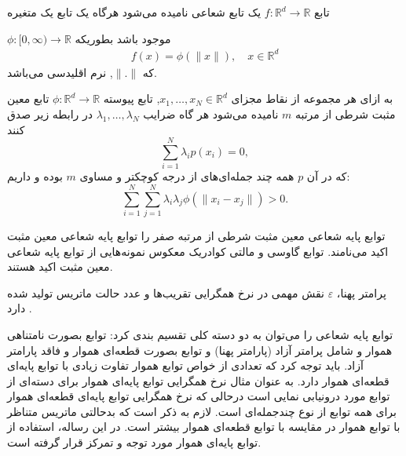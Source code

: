 \begin{definition}
	تابع
	$f:\mathbb{R}^d\rightarrow\mathbb{R}$ 
	یک تابع شعاعی نامیده می‌شود هرگاه یک تابع یک متغیره 
	
	$\phi:[0,\infty)\rightarrow\mathbb{R}$ 
	موجود باشد بطوریکه 
	\begin{eqnarray}
		f(x)=\phi(\|x\|),\quad x\in \mathbb{R}^d\label{eq:radial}
	\end{eqnarray}
	که 
	$\|.\|$,
	نرم اقلیدسی می‌باشد.
\end{definition}
%
\begin{lem}
	به ازای هر مجموعه از نقاط مجزای
	$x_1,\ldots,x_N\in\mathbb{R}^d$,
	تابع پیوسته
	$\phi:\mathbb{R}^d\rightarrow\mathbb{R}$ 
	تابع معین مثبت شرطی  از مرتبه
	$m$
	نامیده می‌شود هر گاه ضرایب
	$\lambda_1,\ldots,\lambda_N$
	در رابطه زیر صدق کنند
	\begin{equation*}
		\sum_{i=1}^{N}\lambda_ip(x_i)=0,
	\end{equation*}
	که در آن
	$p$
	همه چند جمله‌ای‌های از درجه کوچکتر و مساوی
	$m$
	بوده و داریم:
	\begin{equation*}
		\sum_{i=1}^{N}\sum_{j=1}^{N}\lambda_i\lambda_j\phi(\|x_i-x_j\|)>0.
	\end{equation*}
\end{lem}

توابع پایه شعاعی معین مثبت شرطی از مرتبه صفر را توابع پایه شعاعی معین مثبت اکید می‌نامند. توابع گاوسی و مالتی کوادریک معکوس نمونه‌هایی از توابع پایه شعاعی معین مثبت اکید هستند.

پرامتر پهنا،
$\varepsilon$
نقش مهمی در نرخ همگرایی تقریب‌ها و عدد حالت ماتریس تولید شده دارد
\citep{Wendland,Fasshauer}.

توابع پایه شعاعی را می‌توان به دو دسته کلی تقسیم بندی کرد: توابع بصورت نامتناهی هموار و شامل پرامتر آزاد (پارامتر پهنا)
و  توابع بصورت قطعه‌ای هموار و فاقد پارامتر آزاد. باید توجه کرد که تعدادی از خواص توابع هموار تفاوت زیادی با توابع پایه‌ای قطعه‌ای  هموار دارد. به عنوان مثال نرخ همگرایی توابع پایه‌ای هموار برای دسته‌ای از توابع مورد درونیابی نمایی است درحالی که نرخ همگرایی توابع پایه‌ای قطعه‌ای هموار برای همه توابع از نوع چندجمله‌ای است. لازم به ذکر است که  بدحالتی ماتریس متناظر با توابع هموار در مقایسه با توابع قطعه‌ای هموار بیشتر است. در این رساله، استفاده از توابع پایه‌ای هموار مورد توجه و تمرکز قرار گرفته است.

